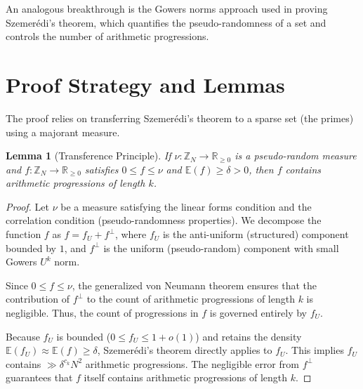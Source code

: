 \documentclass[12pt,a4paper]{article}
\newtheorem{lemma}{Lemma}
\begin{document}
An analogous breakthrough is the Gowers norms approach used in proving Szemer\'edi's theorem, which quantifies the pseudo-randomness of a set and controls the number of arithmetic progressions.

\section{Proof Strategy and Lemmas}

The proof relies on transferring Szemer\'edi's theorem to a sparse set (the primes) using a majorant measure.

\begin{lemma}[Transference Principle]
If $\nu: \mathbb{Z}_N \to \mathbb{R}_{\geq 0}$ is a pseudo-random measure and $f: \mathbb{Z}_N \to \mathbb{R}_{\geq 0}$ satisfies $0 \leq f \leq \nu$ and $\mathbb{E}(f) \geq \delta > 0$, then $f$ contains arithmetic progressions of length $k$.
\end{lemma}
\begin{proof}
Let $\nu$ be a measure satisfying the linear forms condition and the correlation condition (pseudo-randomness properties). We decompose the function $f$ as $f = f_{U} + f^{\perp}$, where $f_{U}$ is the anti-uniform (structured) component bounded by $1$, and $f^{\perp}$ is the uniform (pseudo-random) component with small Gowers $U^k$ norm.

Since $0 \leq f \leq \nu$, the generalized von Neumann theorem ensures that the contribution of $f^{\perp}$ to the count of arithmetic progressions of length $k$ is negligible. Thus, the count of progressions in $f$ is governed entirely by $f_{U}$.

Because $f_{U}$ is bounded ($0 \leq f_{U} \leq 1 + o(1)$) and retains the density $\mathbb{E}(f_{U}) \approx \mathbb{E}(f) \geq \delta$, Szemer\'edi's theorem directly applies to $f_{U}$. This implies $f_{U}$ contains $\gg \delta^{c_k} N^2$ arithmetic progressions. The negligible error from $f^{\perp}$ guarantees that $f$ itself contains arithmetic progressions of length $k$.
\end{proof}
\end{document}
